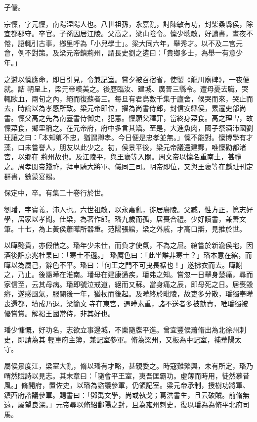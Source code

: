 \begin{pinyinscope}
 子儒。



 宗懍，字元懍，南陽涅陽人也。八世祖孫，永嘉亂，討陳敏有功，封柴桑縣侯，除宜都郡守。卒官。子孫因居江陵。父高之，梁山陰令。懍少聰敏，好讀書，晝夜不倦，語輒引古事，鄉里呼為「小兒學士」。梁大同六年，舉秀才。以不及二宮元會，例不對策。及梁元帝鎮荊州，謂長史劉之遴曰：「貴鄉多士，為舉一有意少年。」



 之遴以懍應命，即日引見，令兼記室。嘗夕被召宿省，使製《龍川廟碑》，一夜便就。詰
 朝呈上，梁元帝嘆美之。後歷臨汝、建城、廣晉三縣令。遭母憂去職，哭輒歐血，兩旬之內，絕而復蘇者三。每旦有君烏數千集于廬舍，候哭而來，哭止而去，時論以為孝感所致。梁元帝即位，擢為尚書侍郎，封信安縣侯，累遷吏部尚書。懍父高之先為南臺書侍御史，犯憲。懍願父釋罪，當終身菜食。高之理雪，故懍菜食，鄉里稱之。在元帝府，府中多言其矯。至是，大進魚肉，國子祭酒沛國劉玨讓之曰：「本知卿不忠，猶謂卿孝。今日便是忠孝並無。」懍不能對。懍博學有才藻，口未嘗譽人，朋友以此少之。初，侯景平後，梁元帝議還建鄴，唯懍勸都渚宮，以鄉在
 荊州故也。及江陵平，與王褒等入關。周文帝以懍名重南土，甚禮之。周孝閔帝踐祚，拜車騎大將軍、儀同三司。明帝即位，又與王褒等在麟趾刊定群書，數蒙宴賜。



 保定中，卒。有集二十卷行於世。



 劉璠，字寶義，沛人也。六世祖敏，以永嘉亂，徙居廣陵。父臧，性方正，篤志好學，居家以孝聞。仕梁，為著作郎。璠九歲而孤，居喪合禮。少好讀書，兼善文筆。十七，為上黃侯蕭曄所器重。范陽張綰，梁之外戚，才高口辯，見推於世。



 以曄懿貴，亦假借之。璠年少未仕，而負才使氣，不為之屈。綰嘗於新渝侯宅，因酒後詬京兆杜杲曰：「寒士不遜。」
 璠厲色曰：「此坐誰非寒士？」璠本意在綰，而曄以為屬己，辭色不平。璠曰：「何王之門不可曳長裾也！」遂拂衣而去。曄謝之，乃止。後隨曄在淮南。璠母在建康遘疾，璠弗之知。嘗忽一日舉身楚痛，尋而家信至，云其母病。璠即號泣戒道，絕而又蘇。當身痛之辰，即母死之日。居喪毀瘠，遂感風氣，服闋後一年，猶杖而後起。及曄終於毗陵，故吏多分散，璠獨奉曄喪還都，墳成乃退。梁簡文寺在東宮，遇曄素重，諸不送者多被劾責，唯璠獨被優嘗賞。解褐王國常侍，非其好也。



 璠少慷慨，好功名，志欲立事邊城，不樂隨牒平進。曾宜豐侯蕭脩出為北徐州刺史，即請為其
 輕車府主簿，兼記室參軍。脩為梁州，又板為中記室，補華陽太守。



 屬侯景度江，梁室大亂，脩以璠有才略，甚親委之。時寇難繁興，未有所定，璠乃喟然賦詩以見志。其末章曰：「隨會平王室，夷吾匡霸功。虛薄而時用，徒然慕昔風。」脩開府，置佐史，以璠為諮議參軍，仍領記室。梁元帝承制，授樹功將軍、鎮西府諮議參軍。賜書曰：「鄧禹文學，尚或執戈；葛洪書生，且云破賊。前脩無遠，屬望良深。」元帝尋以脩紹鄱陽之封，且為雍州刺史，復以璠為為脩平北府司馬。




\end{pinyinscope}
